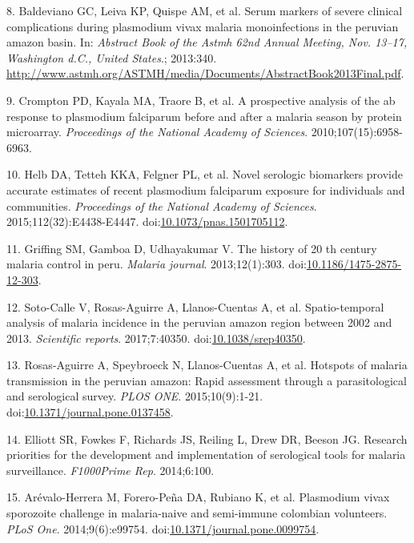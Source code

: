 \documentclass[]{article}
\begin{document}
\hypertarget{ref-baldevi2013}{}
8. Baldeviano GC, Leiva KP, Quispe AM, et al. Serum markers of severe
clinical complications during plasmodium vivax malaria monoinfections in
the peruvian amazon basin. In: \emph{Abstract Book of the Astmh 62nd
Annual Meeting, Nov. 13--17, Washington d.C., United States}.; 2013:340.
\url{http://www.astmh.org/ASTMH/media/Documents/AbstractBook2013Final.pdf}.

\hypertarget{ref-crompton2010}{}
9. Crompton PD, Kayala MA, Traore B, et al. A prospective analysis of
the ab response to plasmodium falciparum before and after a malaria
season by protein microarray. \emph{Proceedings of the National Academy
of Sciences}. 2010;107(15):6958-6963.

\hypertarget{ref-Helb2015exposure}{}
10. Helb DA, Tetteh KKA, Felgner PL, et al. Novel serologic biomarkers
provide accurate estimates of recent plasmodium falciparum exposure for
individuals and communities. \emph{Proceedings of the National Academy
of Sciences}. 2015;112(32):E4438-E4447.
doi:\href{https://doi.org/10.1073/pnas.1501705112}{10.1073/pnas.1501705112}.

\hypertarget{ref-griffing2013history}{}
11. Griffing SM, Gamboa D, Udhayakumar V. The history of 20 th century
malaria control in peru. \emph{Malaria journal}. 2013;12(1):303.
doi:\href{https://doi.org/10.1186/1475-2875-12-303}{10.1186/1475-2875-12-303}.

\hypertarget{ref-soto2017spatio}{}
12. Soto-Calle V, Rosas-Aguirre A, Llanos-Cuentas A, et al.
Spatio-temporal analysis of malaria incidence in the peruvian amazon
region between 2002 and 2013. \emph{Scientific reports}. 2017;7:40350.
doi:\href{https://doi.org/10.1038/srep40350}{10.1038/srep40350}.

\hypertarget{ref-hotspots2015}{}
13. Rosas-Aguirre A, Speybroeck N, Llanos-Cuentas A, et al. Hotspots of
malaria transmission in the peruvian amazon: Rapid assessment through a
parasitological and serological survey. \emph{PLOS ONE}.
2015;10(9):1-21.
doi:\href{https://doi.org/10.1371/journal.pone.0137458}{10.1371/journal.pone.0137458}.

\hypertarget{ref-elliott2014}{}
14. Elliott SR, Fowkes F, Richards JS, Reiling L, Drew DR, Beeson JG.
Research priorities for the development and implementation of
serological tools for malaria surveillance. \emph{F1000Prime Rep}.
2014;6:100.

\hypertarget{ref-arevalo2014}{}
15. Arévalo-Herrera M, Forero-Peña DA, Rubiano K, et al. Plasmodium
vivax sporozoite challenge in malaria-naive and semi-immune colombian
volunteers. \emph{PLoS One}. 2014;9(6):e99754.
doi:\href{https://doi.org/10.1371/journal.pone.0099754}{10.1371/journal.pone.0099754}.
\end{document}
